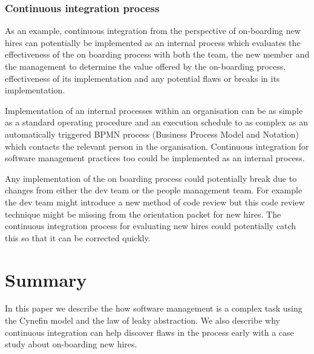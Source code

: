 \documentclass[12pt,conference]{IEEEtran}
\begin{document}
\subsubsection*{Continuous integration process}
As an example, continuous integration from the perspective of on-boarding new hires can potentially be implemented as an internal process which evaluates the effectiveness of the on boarding process with both the team, the new member and the management to determine the value offered by the on-boarding process, effectiveness of its implementation and any potential flaws or breaks in its implementation. 

Implementation of an internal processes within an organisation can be as simple as a standard operating procedure and an execution schedule to as complex as an automatically triggered BPMN process  (Business Process Model and Notation) \cite{miller_employee_2016} which contacts the relevant person in the organisation. Continuous integration for software management practices too could be implemented as an internal process.

Any implementation of the on boarding process could potentially break due to changes from either the dev team or the people management team. For example the dev team might introduce a new method of code review but this code review technique might be missing from the orientation packet for new hires. The continuous integration process for evaluating new hires could potentially catch this so that it can be corrected quickly.

\section*{Summary}

In this paper we describe the how software management is a complex task using the Cynefin model and the law of leaky abstraction. We also describe why continuous integration can help discover flaws in the process early with a case study about on-boarding new hires.



\end{document}
